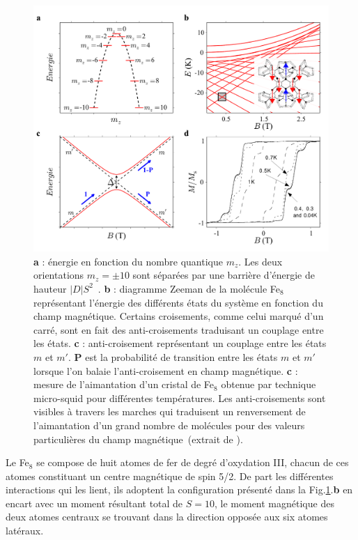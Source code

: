 \begin{figure}
\centering \includegraphics[scale=0.45]{Annexe1/FigureFe8/FigureFe8.pdf} 
\caption{\textbf{a} : énergie en fonction du nombre quantique $m_z$. Les deux orientations $m_z=\pm 10$ sont séparées par une barrière d'énergie de hauteur $|D|S^2$~\cite{Bogani2008}. \textbf{b} : diagramme Zeeman de la molécule Fe$_8$ représentant l'énergie des différents états du système en fonction du champ magnétique. Certains croisements, comme celui marqué d'un carré, sont en fait des anti-croisements traduisant un couplage entre les états. \textbf{c} : anti-croisement représentant un couplage entre les états $m$ et $m'$. \textbf{P} est la probabilité de transition entre les états $m$ et $m'$ lorsque l'on balaie l'anti-croisement en champ magnétique. \textbf{c} : mesure de l'aimantation d'un cristal de Fe$_8$ obtenue par technique micro-squid pour différentes températures. Les anti-croisements sont visibles à travers les marches qui traduisent un renversement de l'aimantation d'un grand nombre de molécules pour des valeurs particulières du champ magnétique~(extrait de \cite{MagGoesNano}).}
\label{Fe8Zeeman}
\end{figure}


Le Fe$_8$ se compose de huit atomes de fer de degré d'oxydation III, chacun de ces atomes constituant un centre magnétique de spin 5/2. De part les différentes interactions qui les lient, ils adoptent la configuration présenté dans la Fig.\ref{Fe8Zeeman}.\textbf{b} en encart avec un moment résultant total de $S=10$, le moment magnétique des deux atomes centraux se trouvant dans la direction opposée aux six atomes latéraux.

